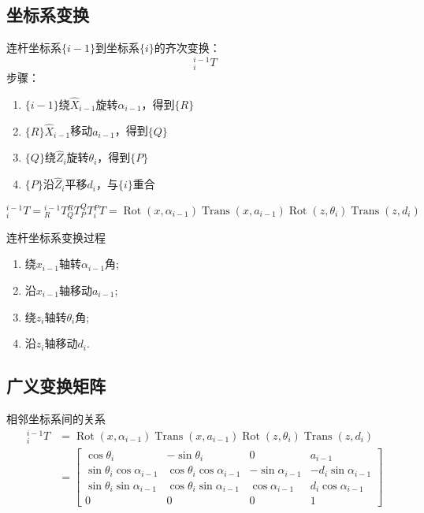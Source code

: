 \subsection{坐标系变换}

连杆坐标系$\{i-1\}$到坐标系$\{i\}$的齐次变换：
$$
{}^{i-1}_i T
$$
步骤：
\begin{enumerate}
    \item $\{i-1\}$绕$\hat{X}_{i-1}$旋转$\alpha_{i-1}$，得到$\{R\}$
    \item $\{R\}$$\hat{X}_{i-1}$移动$a_{i-1}$，得到$\{Q\}$
    \item $\{Q\}$绕$\hat{Z}_i$旋转$\theta_i$，得到$\{P\}$
    \item $\{P\}$沿$\hat{Z}_i$平移$d_i$，与$\{i\}$重合
\end{enumerate}

\[
{}^{i-1}_i T = {}^{i-1}_R T {}^R_Q T {}^Q_P T {}^P_i T = \operatorname{Rot}(x, \alpha_{i-1}) \operatorname{Trans}(x, a_{i-1}) \operatorname{Rot}(z, \theta_i) \operatorname{Trans}(z, d_i)
\]

连杆坐标系变换过程
\begin{enumerate}
    \item 绕\(x_{i-1}\)轴转\(\alpha_{i-1}\)角;
    \item 沿\(x_{i-1}\)轴移动\(a_{i-1}\);
    \item 绕\(z_{i}\)轴转\(\theta_{i}\)角;
    \item 沿\(z_{i}\)轴移动\(d_{i}\).
\end{enumerate}

\subsection{广义变换矩阵}

相邻坐标系间的关系
\[
\begin{aligned}
    {}^{i-1}_i T &=\operatorname{Rot}(x, \alpha_{i-1}) \operatorname{Trans}(x, a_{i-1}) \operatorname{Rot}(z, \theta_i) \operatorname{Trans}(z, d_i) \\
    &=\begin{bmatrix} \cos\theta_i & -\sin\theta_i & 0 & a_{i-1} \\ \sin\theta_i\cos\alpha_{i-1} & \cos\theta_i\cos\alpha_{i-1} & -\sin\alpha_{i-1} & -d_i\sin\alpha_{i-1} \\ \sin\theta_i\sin\alpha_{i-1} & \cos\theta_i\sin\alpha_{i-1} & \cos\alpha_{i-1} & d_i\cos\alpha_{i-1} \\ 0 & 0 & 0 & 1 \end{bmatrix}
\end{aligned}
\]

